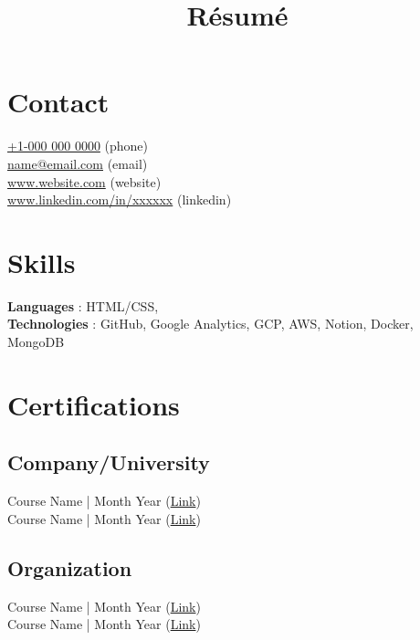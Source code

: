 \documentclass[a4paper, 11pt]{article} %
\title{Résumé}
\begin{document}
\noindent %
\begin{bgbox}[height=\paperheight,colback=SwishLineColour, coltext=white,
width=0.33\textwidth,rightrule=1pt,colframe=SwishLineColour]

\section*{Contact}
\vspace{-8pt}
\href{tel:+1-0000000000}{+1-000 000 0000} {\color{dark-grey} (phone)} \vspace{2pt} \\
\href{mailto:name@email.com}{name@email.com} {\color{dark-grey} (email)} \vspace{2pt} \\
\href{https://www.website.com}{www.website.com} {\color{dark-grey} (website)} \vspace{2pt} \\
\href{https://www.linkedin.com/in/xxxxxxxxx}{www.linkedin.com/in/xxxxxx} {\color{dark-grey} (linkedin)}
\vspace{16pt}


\section*{Skills}
\vspace{-8pt}
\textbf{Languages} {: HTML/CSS, }\vspace{8pt} \\
\textbf{Technologies}  {: GitHub, Google Analytics, GCP, AWS, Notion, Docker, MongoDB}
\vspace{16pt}


\section*{Certifications}
\vspace{-8pt}
\subsection*{Company/University}
Course Name | Month Year (\href{https://www.coursera.org/}{Link}) \vspace{2pt} \\
Course Name | Month Year (\href{https://www.udemy.com/}{Link})

\subsection*{Organization}
Course Name | Month Year (\href{https://www.edx.org/}{Link}) \vspace{2pt} \\
Course Name | Month Year (\href{https://www.yahoo.com/}{Link})
\vspace{16pt}


\end{bgbox}
\end{document}
